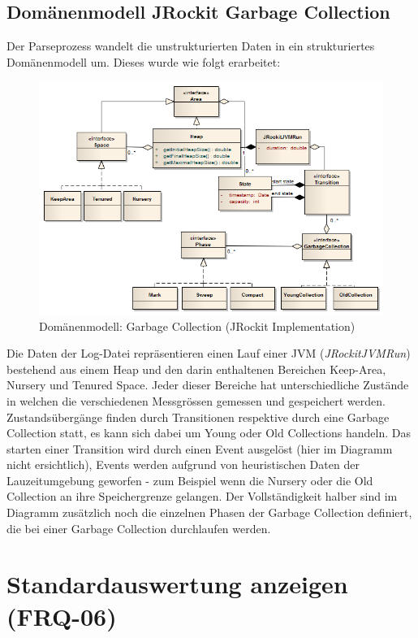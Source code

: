\subsection{Domänenmodell JRockit Garbage Collection}\label{jrockit_domain_model}
Der Parseprozess wandelt die unstrukturierten Daten in ein strukturiertes Domänenmodell um. Dieses wurde wie folgt erarbeitet:
\begin{landscape}
 \begin{figure}[H]
  	\centering
        	\includegraphics[width=16.5cm]{images/jrockit_extension_domain}
	\caption{Domänenmodell: Garbage Collection (JRockit Implementation)}
\end{figure}
\end{landscape}
Die Daten der Log-Datei repräsentieren einen Lauf einer JVM (\textit{JRockitJVMRun}) bestehend aus einem Heap und den darin enthaltenen Bereichen Keep-Area, Nursery und Tenured Space. Jeder dieser Bereiche hat unterschiedliche Zustände in welchen die verschiedenen Messgrössen gemessen und gespeichert werden. Zustandsübergänge finden durch Transitionen respektive durch eine Garbage Collection statt, es kann sich dabei um Young oder Old Collections handeln. Das starten einer Transition wird durch einen Event ausgelöst (hier im Diagramm nicht ersichtlich), Events werden aufgrund von heuristischen Daten der Lauzeitumgebung geworfen - zum Beispiel wenn die Nursery oder die Old Collection an ihre Speichergrenze gelangen. Der Vollständigkeit halber sind im Diagramm zusätzlich noch die einzelnen Phasen der Garbage Collection definiert, die bei einer Garbage Collection durchlaufen werden.

\section{Standardauswertung anzeigen (FRQ-06)}
